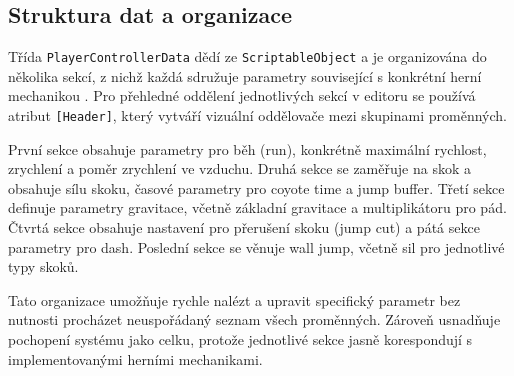 \subsection{Struktura dat a organizace}

Třída \texttt{PlayerControllerData} dědí ze \texttt{ScriptableObject} a je organizována do několika sekcí, z nichž každá sdružuje parametry související s konkrétní herní mechanikou \cite{clean-code}. Pro přehledné oddělení jednotlivých sekcí v editoru se používá atribut \texttt{[Header]}, který vytváří vizuální oddělovače mezi skupinami proměnných.

První sekce obsahuje parametry pro běh (run), konkrétně maximální rychlost, zrychlení a poměr zrychlení ve vzduchu. Druhá sekce se zaměřuje na skok a obsahuje sílu skoku, časové parametry pro coyote time a jump buffer. Třetí sekce definuje parametry gravitace, včetně základní gravitace a multiplikátoru pro pád. Čtvrtá sekce obsahuje nastavení pro přerušení skoku (jump cut) a pátá sekce parametry pro dash. Poslední sekce se věnuje wall jump, včetně sil pro jednotlivé typy skoků.

Tato organizace umožňuje rychle nalézt a upravit specifický parametr bez nutnosti procházet neuspořádaný seznam všech proměnných. Zároveň usnadňuje pochopení systému jako celku, protože jednotlivé sekce jasně korespondují s implementovanými herními mechanikami.